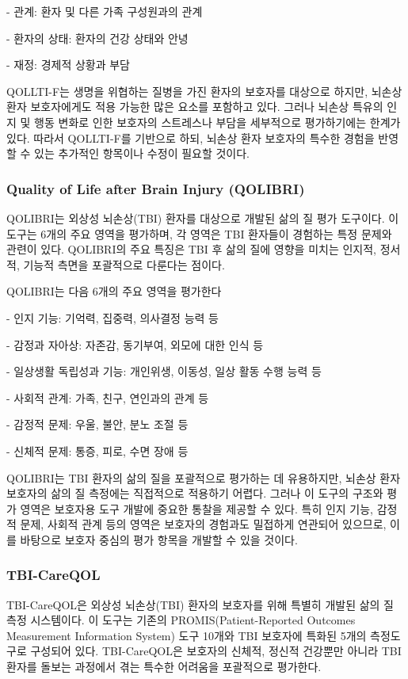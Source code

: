 \documentclass{article}
\begin{document}
- 관계: 환자 및 다른 가족 구성원과의 관계

- 환자의 상태: 환자의 건강 상태와 안녕

- 재정: 경제적 상황과 부담

QOLLTI-F는 생명을 위협하는 질병을 가진 환자의 보호자를 대상으로 하지만, 뇌손상 환자 보호자에게도 적용 가능한 많은 요소를 포함하고 있다. 그러나 뇌손상 특유의 인지 및 행동 변화로 인한 보호자의 스트레스나 부담을 세부적으로 평가하기에는 한계가 있다. 따라서 QOLLTI-F를 기반으로 하되, 뇌손상 환자 보호자의 특수한 경험을 반영할 수 있는 추가적인 항목이나 수정이 필요할 것이다.

\subsubsection{Quality of Life after Brain Injury (QOLIBRI)}
QOLIBRI는 외상성 뇌손상(TBI) 환자를 대상으로 개발된 삶의 질 평가 도구이다. 이 도구는 6개의 주요 영역을 평가하며, 각 영역은 TBI 환자들이 경험하는 특정 문제와 관련이 있다. QOLIBRI의 주요 특징은 TBI 후 삶의 질에 영향을 미치는 인지적, 정서적, 기능적 측면을 포괄적으로 다룬다는 점이다.

QOLIBRI는 다음 6개의 주요 영역을 평가한다

- 인지 기능: 기억력, 집중력, 의사결정 능력 등

- 감정과 자아상: 자존감, 동기부여, 외모에 대한 인식 등

- 일상생활 독립성과 기능: 개인위생, 이동성, 일상 활동 수행 능력 등

- 사회적 관계: 가족, 친구, 연인과의 관계 등

- 감정적 문제: 우울, 불안, 분노 조절 등

- 신체적 문제: 통증, 피로, 수면 장애 등

QOLIBRI는 TBI 환자의 삶의 질을 포괄적으로 평가하는 데 유용하지만, 뇌손상 환자 보호자의 삶의 질 측정에는 직접적으로 적용하기 어렵다. 그러나 이 도구의 구조와 평가 영역은 보호자용 도구 개발에 중요한 통찰을 제공할 수 있다. 특히 인지 기능, 감정적 문제, 사회적 관계 등의 영역은 보호자의 경험과도 밀접하게 연관되어 있으므로, 이를 바탕으로 보호자 중심의 평가 항목을 개발할 수 있을 것이다.

\subsubsection{TBI-CareQOL}
TBI-CareQOL은 외상성 뇌손상(TBI) 환자의 보호자를 위해 특별히 개발된 삶의 질 측정 시스템이다. 이 도구는 기존의 PROMIS(Patient-Reported Outcomes Measurement Information System) 도구 10개와 TBI 보호자에 특화된 5개의 측정도구로 구성되어 있다. TBI-CareQOL은 보호자의 신체적, 정신적 건강뿐만 아니라 TBI 환자를 돌보는 과정에서 겪는 특수한 어려움을 포괄적으로 평가한다.
\end{document}
